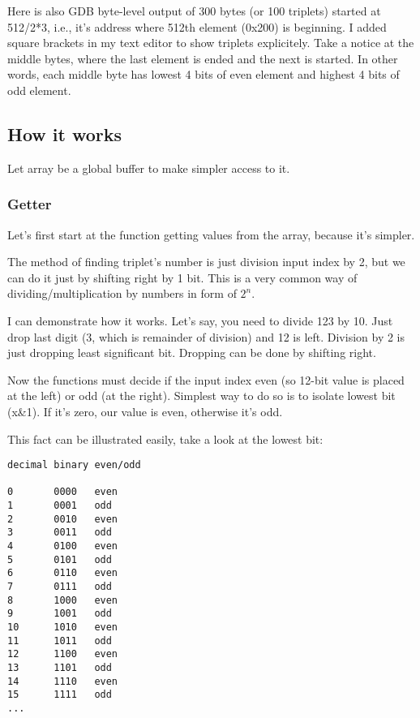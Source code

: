 Here is also GDB byte-level output of 300 bytes (or 100 triplets) started at 512/2*3, i.e., it's address where 512th element (0x200) is beginning.
I added square brackets in my text editor to show triplets explicitely.
Take a notice at the middle bytes, where the last element is ended and the next is started.
In other words, each middle byte has lowest 4 bits of even element and highest 4 bits of odd element.



\subsection{How it works}

Let array be a global buffer to make simpler access to it.

\subsubsection{Getter}

Let's first start at the function getting values from the array, because it's simpler.

The method of finding triplet's number is just division input index by 2, but we can do it just by shifting right by 1 bit.
This is a very common way of dividing/multiplication by numbers in form of $2^n$.

I can demonstrate how it works. Let's say, you need to divide 123 by 10.
Just drop last digit (3, which is remainder of division) and 12 is left.
Division by 2 is just dropping least significant bit. Dropping can be done by shifting right.

Now the functions must decide if the input index even (so 12-bit value is placed at the left) or odd (at the right).
Simplest way to do so is to isolate lowest bit (x\&1). If it's zero, our value is even, otherwise it's odd.

This fact can be illustrated easily, take a look at the lowest bit:

\begin{lstlisting}
decimal binary even/odd

0       0000   even
1       0001   odd
2       0010   even
3       0011   odd
4       0100   even
5       0101   odd
6       0110   even
7       0111   odd
8       1000   even
9       1001   odd
10      1010   even
11      1011   odd
12      1100   even
13      1101   odd
14      1110   even
15      1111   odd
...
\end{lstlisting}

